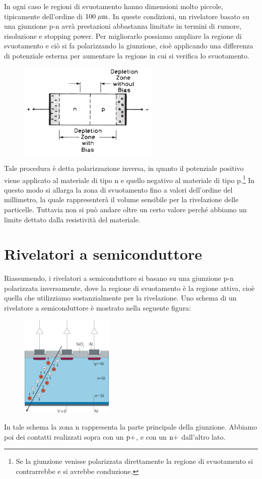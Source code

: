 In ogni caso le regioni di svuotamento hanno dimensioni molto piccole, tipicamente dell'ordine di $100 \; \rm \mu m$. In queste condizioni, un rivelatore basato su una giunzione p-n avrà prestazioni abbastanza limitate in termini di rumore, risoluzione e stopping power. Per migliorarlo possiamo ampliare la regione di svuotamento e ciò si fa polarizzando la giunzione, cioè applicando una differenza di potenziale esterna per aumentare la regione in cui si verifica lo svuotamento.
\begin{figure}[H]
   \centering
   \includegraphics[width=0.6\textwidth]{immagini/regione_svuotamento_ampliata.png}
\end{figure}
Tale procedura è detta polarizzazione inversa, in quanto il potenziale positivo viene applicato al materiale di tipo n e quello negativo al materiale di tipo p.\footnote{Se la giunzione venisse polarizzata direttamente la regione di svuotamento si contrarrebbe e si avrebbe conduzione.} In questo modo si allarga la zona di svuotamento fino a valori dell'ordine del millimetro, la quale rappresenterà il volume sensibile per la rivelazione delle particelle. Tuttavia non si può andare oltre un certo valore perché abbiamo un limite dettato dalla resistività del materiale.

\vfill

\section{Rivelatori a semiconduttore}
Riassumendo, i rivelatori a semiconduttore si basano su una giunzione p-n polarizzata inversamente, dove la regione di svuotamento è la regione attiva, cioè quella che utilizziamo sostanzialmente per la rivelazione. Uno schema di un rivelatore a semiconduttore è mostrato nella seguente figura:
\begin{figure}[H]
   \centering
   \includegraphics[width=0.4\textwidth]{immagini/rivelatore_a_semiconduttore.png}
\end{figure}
In tale schema la zona n rappresenta la parte principale della giunzione. Abbiamo poi dei contatti realizzati sopra con un $\rm p+$, e con un $\rm n+$ dall'altro lato.

